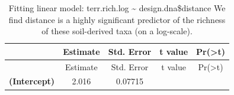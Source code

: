 \documentclass[]{article}
\begin{document}
\begin{longtable}[]{@{}ccccc@{}}
\caption{Fitting linear model: terr.rich.log \textasciitilde{}
design.dna\$distance We find distance is a highly significant predictor
of the richness of these soil-derived taxa (on a
log-scale).}\tabularnewline
\toprule
\begin{minipage}[b]{0.31\columnwidth}\centering\strut
~\strut
\end{minipage} & \begin{minipage}[b]{0.13\columnwidth}\centering\strut
Estimate\strut
\end{minipage} & \begin{minipage}[b]{0.16\columnwidth}\centering\strut
Std. Error\strut
\end{minipage} & \begin{minipage}[b]{0.12\columnwidth}\centering\strut
t value\strut
\end{minipage} & \begin{minipage}[b]{0.13\columnwidth}\centering\strut
Pr(\textgreater{}\textbar{}t\textbar{})\strut
\end{minipage}\tabularnewline
\midrule
\endfirsthead
\toprule
\begin{minipage}[b]{0.31\columnwidth}\centering\strut
~\strut
\end{minipage} & \begin{minipage}[b]{0.13\columnwidth}\centering\strut
Estimate\strut
\end{minipage} & \begin{minipage}[b]{0.16\columnwidth}\centering\strut
Std. Error\strut
\end{minipage} & \begin{minipage}[b]{0.12\columnwidth}\centering\strut
t value\strut
\end{minipage} & \begin{minipage}[b]{0.13\columnwidth}\centering\strut
Pr(\textgreater{}\textbar{}t\textbar{})\strut
\end{minipage}\tabularnewline
\midrule
\endhead
\begin{minipage}[t]{0.31\columnwidth}\centering\strut
\textbf{(Intercept)}\strut
\end{minipage} & \begin{minipage}[t]{0.13\columnwidth}\centering\strut
2.016\strut
\end{minipage} & \begin{minipage}[t]{0.16\columnwidth}\centering\strut
0.07715\strut
\end{minipage} & \begin{minipage}[t]{0.12\columnwidth}\centering\strut

\end{minipage}
\end{longtable}
\end{document}
